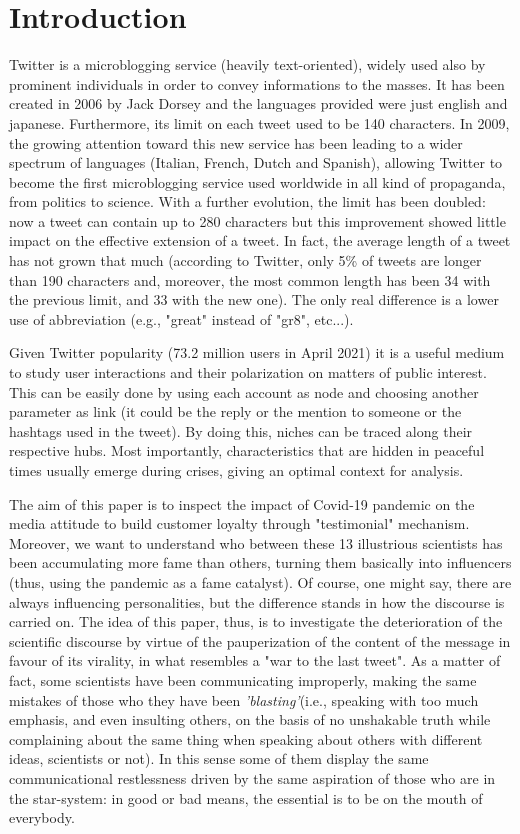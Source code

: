 \documentclass[sigchi]{acmart}
\begin{document}
\section{Introduction}
Twitter is a microblogging service (heavily text-oriented), widely used also by prominent individuals in order to convey informations to the masses. It has been created in 2006 by Jack Dorsey and the languages provided were just english and japanese. Furthermore, its limit on each tweet used to be 140 characters. In 2009, the growing attention toward this new service has been leading to a wider spectrum of languages (Italian, French, Dutch and Spanish), allowing Twitter to become the first microblogging service used worldwide in all kind of propaganda, from politics to science. With a further evolution, the limit has been doubled: now a tweet can contain up to 280 characters but this improvement showed little impact on the effective extension of a tweet. In fact, the average length of a tweet has not grown that much (according to Twitter, only 5\% of tweets are longer than 190 characters and, moreover, the most common length has been 34 with the previous limit, and 33 with the new one). The only real difference is a lower use of abbreviation (e.g., "great" instead of "gr8", etc...).

Given Twitter popularity (73.2 million users in April 2021) it is a useful medium to study user interactions and their polarization on matters of public interest. This can be easily done by using each account as node and choosing another parameter as link (it could be the reply or the mention to someone or the hashtags used in the tweet). By doing this, niches can be traced along their respective hubs. Most importantly, characteristics that are hidden in peaceful times usually emerge during crises, giving an optimal context for analysis.


The aim of this paper is to inspect the impact of Covid-19 pandemic on the media attitude to build customer loyalty through "testimonial" mechanism. Moreover, we want to understand who between these 13 illustrious scientists has been accumulating more fame than others, turning them basically into influencers (thus, using the pandemic as a fame catalyst). Of course, one might say, there are always influencing personalities, but the difference stands in how the discourse is carried on. The idea of this paper, thus, is to investigate the deterioration of the scientific discourse by virtue of the pauperization of the content of the message in favour of its virality, in what resembles a "war to the last tweet". As a matter of fact, some scientists have been communicating improperly, making the same mistakes of those who they have been \textit{'blasting'}(i.e., speaking with too much emphasis, and even insulting others, on the basis of no unshakable truth while complaining about the same thing when speaking about others with different ideas, scientists or not). In this sense some of them display the same communicational restlessness driven by the same aspiration of those who are in the star-system: in good or bad means, the essential is to be on the mouth of everybody.
\end{document}
